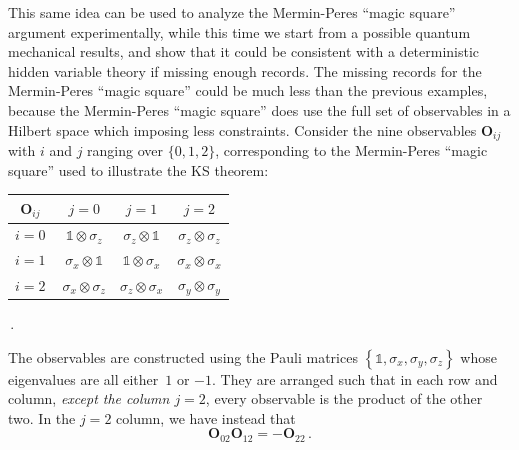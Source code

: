 \documentclass[english,reprint, aps, prl,superscriptaddress, showpacs,
showkeys, longbibliography, amsmath, amssymb, floatfix]{revtex4-1}
\theoremstyle{plain}
\theoremstyle{definition}
\begin{document}
This same idea can be used to analyze the Mermin-Peres ``magic square''
argument experimentally, while this time we start from a possible
quantum mechanical results, and show that it could be consistent with
a deterministic hidden variable theory if missing enough records.
The missing records for the Mermin-Peres ``magic square'' could
be much less than the previous examples, because the Mermin-Peres
``magic square'' does use the full set of observables in a Hilbert
space which imposing less constraints. Consider the nine observables
$\mathbf{O}_{ij}$ with $i$ and $j$ ranging over $\{0,1,2\}$, corresponding
to the Mermin-Peres ``magic square'' used to illustrate the KS theorem:


{\renewcommand{\arraystretch}{2}%
\begin{center} 
\begin{tabular}{r|@{\quad}c@{\quad}|@{\quad}c@{\quad}|@{\quad}c@{\quad}|} 
$\mathbf{O}_{ij}$~ & $j=0$ & $j=1$ & $j=2$ \\ 
\hline  
$i=0~$ & $\mathbb{1}\otimes\sigma_{z}$  & $\sigma_{z}\otimes\mathbb{1}$  & $\sigma_{z}\otimes\sigma_{z}$ \tabularnewline 
\hline  
$i=1~$ & $\sigma_{x}\otimes\mathbb{1}$  & $\mathbb{1}\otimes\sigma_{x}$  & $\sigma_{x}\otimes\sigma_{x}$ \tabularnewline 
\hline  
$i=2~$ & $\sigma_{x}\otimes\sigma_{z}$  & $\sigma_{z}\otimes\sigma_{x}$  & $\sigma_{y}\otimes\sigma_{y}$ \tabularnewline 
\hline  
\end{tabular}\,.
\par\end{center} 
}

\noindent The observables are constructed using the Pauli matrices
$\left\{ \mathbb{1},\sigma_{x},\sigma_{y},\sigma_{z}\right\} $ whose
eigenvalues are all either~$1$ or $-1$. They are arranged such
that in each row and column, \emph{except the column $j=2$}, every
observable is the product of the other two. In the $j=2$ column,
we have instead that 
\begin{equation}
\mathbf{O}_{02}\mathbf{O}_{12}=-\mathbf{O}_{22}\,.\label{eq:j_2_expectation_value}
\end{equation}
\end{document}
